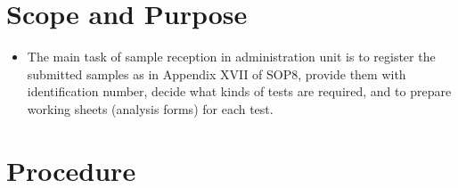 \documentclass[]{book}
\providecommand{\tightlist}{%
  \setlength{\itemsep}{0pt}\setlength{\parskip}{0pt}}
\begin{document}
\section{Scope and Purpose}\label{scope-and-purpose-3}

\begin{itemize}
\tightlist
\item
  The main task of sample reception in administration unit is to
  register the submitted samples as in Appendix XVII of SOP8, provide
  them with identification number, decide what kinds of tests are
  required, and to prepare working sheets (analysis forms) for each
  test.
\end{itemize}

\section{Procedure}\label{procedure-1}
\end{document}
